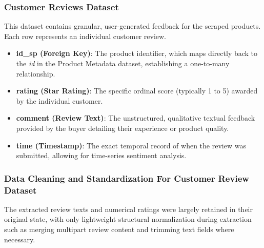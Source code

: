         \subsubsection{Customer Reviews Dataset}
        This dataset contains granular, user-generated feedback for the scraped products. Each row represents an individual customer review.
        \begin{itemize}
            \item \textbf{id\_sp (Foreign Key)}: The product identifier, which maps directly back to the \textit{id} in the Product Metadata dataset, establishing a one-to-many relationship.
            \item \textbf{rating (Star Rating)}: The specific ordinal score (typically 1 to 5) awarded by the individual customer.
            \item \textbf{comment (Review Text)}: The unstructured, qualitative textual feedback provided by the buyer detailing their experience or product quality.
            \item \textbf{time (Timestamp)}: The exact temporal record of when the review was submitted, allowing for time-series sentiment analysis.
        \end{itemize}
        \subsubsection{Data Cleaning and Standardization For Customer Review Dataset}
        The extracted review texts and numerical ratings were largely retained in their original state, with only lightweight structural normalization during extraction such as merging multipart review content and trimming text fields where necessary.
